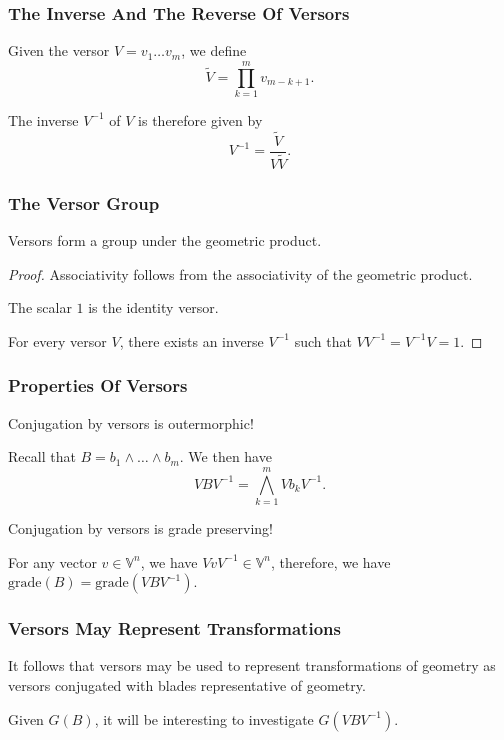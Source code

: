 \documentclass{beamer}
\newcommand{\V}{\mathbb{V}}
\newcommand{\grade}{\mbox{grade}}
\begin{document}
\begin{frame}
\frametitle{The Inverse And The Reverse Of Versors}
\begin{definition}
Given the versor $V=v_1\dots v_m$, we define
\begin{equation*}
\tilde{V} = \prod_{k=1}^m v_{m-k+1}.
\end{equation*}
\end{definition}\pause
The inverse $V^{-1}$ of $V$ is therefore given by
\begin{equation*}
V^{-1} = \frac{\tilde{V}}{V\tilde{V}}.
\end{equation*}
\end{frame}

\begin{frame}
\frametitle{The Versor Group}
Versors form a group under the geometric product.\pause
\begin{proof}
\alert{Associativity} follows from the associativity of the geometric product.

The scalar $1$ is the \alert{identity} versor.

For every versor $V$, there exists an \alert{inverse} $V^{-1}$ such that $VV^{-1}=V^{-1}V=1$.
\end{proof}
\end{frame}

\begin{frame}
\frametitle{Properties Of Versors}
Conjugation by versors is \alert{outermorphic}!\pause

Recall that $B=b_1\wedge\dots\wedge b_m$.
We then have
\begin{equation*}
VBV^{-1} = \bigwedge_{k=1}^m Vb_kV^{-1}.
\end{equation*}\pause

Conjugation by versors is \alert{grade preserving}!\pause

For any vector $v\in\V^n$, we have $VvV^{-1}\in\V^n$,
therefore, we have $\grade(B)=\grade(VBV^{-1})$.

\end{frame}

\begin{frame}
\frametitle{Versors May Represent Transformations}
It follows that versors may be used to represent transformations
of geometry as versors conjugated with blades representative of geometry.\pause

Given $G(B)$, it will be interesting to investigate $G(VBV^{-1})$.
\end{frame}
\end{document}

